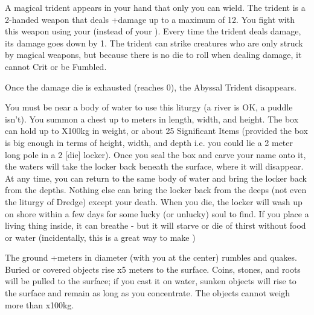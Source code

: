{
\MYSTERY [
  Name = Abyssal Trident,
  Link = arcana-mystery-abyssal-trident,
  Paradigm = Force,
  Save = N,
  Duration = Session,
  Target = Self
]

A magical trident appears in your hand that only you can wield.  The trident is a 2-handed weapon that deals \DICE+\DICE damage up to a maximum of 12.   You fight with this weapon using your \FOC (instead of your \VIG).  Every time the trident deals damage, its damage goes down by 1. The trident can strike creatures who are only struck by magical weapons, but because there is no die to roll when dealing damage, it cannot Crit or be Fumbled. 

Once the damage die is exhausted (reaches 0), the Abyssal Trident disappears.

\MYSTERY [
  Name = Davy Jones's Locker,
  Link = arcana-mystery-davy-joness-locker,
  Paradigm = Prophesy,
  Save = N,
  Duration = Instant,
  Target = Close Target(s)
]

You must be near a body of water to use this liturgy (a river is OK, a puddle isn't).  You summon a chest up to \DICE meters in length, width, and height.  The box can hold up to \DICE X100kg in weight, or about 25 Significant Items (provided the box is big enough in terms of height, width, and depth i.e. you could lie a 2 meter long pole in a 2 [die] locker).  Once you seal the box and carve your name onto it, the waters will take the locker back beneath the surface, where it will disappear.  At any time, you can return to the same body of water and bring the locker back from the depths. Nothing else can bring the locker back from the deeps (not even the liturgy of Dredge) except your death.  When you die, the locker will wash up on shore within a few days for some lucky (or unlucky) soul to find.
If you place a living thing inside, it can breathe - but it will starve or die of thirst without food or water (incidentally, this is a great way to make )

\MYSTERY [
  Name = Dredge,
  Link = arcana-mystery-dredge,
  Paradigm = Mind,
  Save = N,
  Duration = Concentration,
  Target = Close or Nearby
]

The ground \DICE+\DICE meters in diameter (with you at the center) rumbles and quakes.  Buried or covered objects rise \DICE x5 meters to the surface.  Coins, stones, and roots will be pulled to the surface; if you cast it on water, sunken objects will rise to the surface and remain as long as you concentrate.  The objects cannot weigh more than \DICE x100kg.  

}
